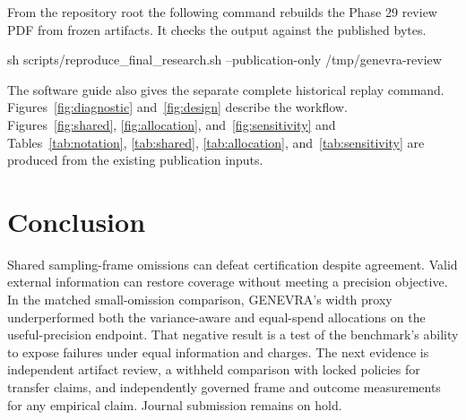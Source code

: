 \documentclass[article,nojss]{jss}
\begin{document}
From the repository root the following command rebuilds the Phase 29 review PDF
from frozen artifacts. It checks the output against the published bytes.
\begin{Code}
sh scripts/reproduce_final_research.sh --publication-only /tmp/genevra-review
\end{Code}
The software guide also gives the separate complete historical replay command.
Figures~\ref{fig:diagnostic} and~\ref{fig:design} describe the workflow.
Figures~\ref{fig:shared}, \ref{fig:allocation}, and~\ref{fig:sensitivity}
and Tables~\ref{tab:notation}, \ref{tab:shared}, \ref{tab:allocation},
and~\ref{tab:sensitivity} are produced from the existing publication inputs.

\section{Conclusion}

Shared sampling-frame omissions can defeat certification despite
agreement. Valid external information can restore coverage without
meeting a precision objective. In the matched small-omission comparison,
GENEVRA's width proxy underperformed both the variance-aware and
equal-spend allocations on the useful-precision endpoint. That negative
result is a test of the benchmark's ability to expose failures under
equal information and charges. The next evidence is independent artifact
review, a withheld comparison with locked policies for transfer claims,
and independently governed frame and outcome measurements for any
empirical claim. Journal submission remains on hold.


\end{document}

